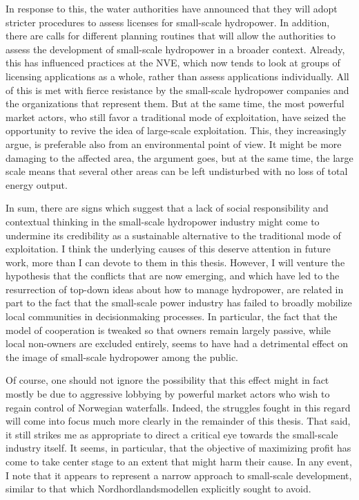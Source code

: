 In response to this, the water authorities have announced that they will adopt stricter procedures to assess licenses for small-scale hydropower. In addition, there are calls for different planning routines that will allow the authorities to assess the development of small-scale hydropower in a broader context. Already, this has influenced practices at the NVE, which now tends to look at groups of licensing applications as a whole, rather than assess applications individually. All of this is met with fierce resistance by the small-scale hydropower companies and the organizations that represent them. But at the same time, the most powerful market actors, who still favor a traditional mode of exploitation, have seized the opportunity to revive the idea of large-scale exploitation. This, they increasingly argue, is preferable also from an environmental point of view. It might be more damaging to the affected area, the argument goes, but at the same time, the large scale means that several other areas can be left undisturbed with no loss of total energy output.

In sum, there are signs which suggest that a lack of social responsibility and contextual thinking in the small-scale hydropower industry might come to undermine its credibility as a sustainable alternative to the traditional mode of exploitation. I think the underlying causes of this deserve attention in future work, more than I can devote to them in this thesis. However, I will venture the hypothesis that the conflicts that are now emerging, and which have led to the resurrection of top-down ideas about how to manage hydropower, are related in part to the fact that the small-scale power industry has failed to broadly mobilize local communities in decisionmaking processes. In particular, the fact that the model of cooperation is tweaked so that owners remain largely passive, while local non-owners are excluded entirely, seems to have had a detrimental effect on the image of small-scale hydropower among the public. 

Of course, one should not ignore the possibility that this effect might in fact mostly be due to aggressive lobbying by powerful market actors who wish to regain control of Norwegian waterfalls. Indeed, the struggles fought in this regard will come into focus much more clearly in the remainder of this thesis. That said, it still strikes me as appropriate to direct a critical eye towards the small-scale industry itself. It seems, in particular, that the objective of maximizing profit has come to take center stage to an extent that might harm their cause. In any event, I note that it appears to represent a narrow approach to small-scale development, similar to that which Nordhordlandsmodellen explicitly sought to avoid.

